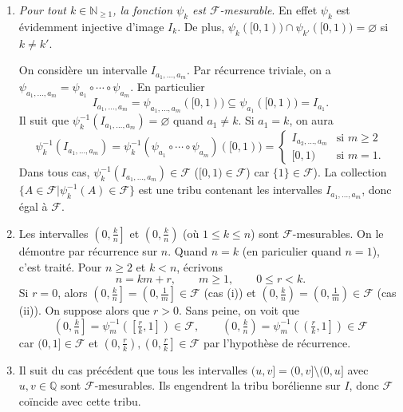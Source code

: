 \documentclass[french]{article}
\theoremstyle{definition}
\newcommand{\tuple}[1]{\left(#1\right)}
\newcommand{\oin}[1]{\left(#1\right)}
\newcommand{\cin}[1]{\left[#1\right]}
\newcommand{\olin}[1]{\left(#1\right]}
\newcommand{\Nbb}{\mathbb{N}}
\newcommand{\Qbb}{\mathbb{Q}}
\newcommand{\Fcal}{\mathcal{F}}
\begin{document}
\begin{enumerate}
\begin{enumerate}
\begin{enumerate}
                \item {\it Pour tout $k \in \Nbb_{\ge 1}$, la fonction $\psi_k$ est $\Fcal$-mesurable}. En effet $\psi_k$ est \'evidemment injective d'image $I_k$. De plus, $\psi_k([0,1)) \cap \psi_{k'}([0,1)) = \varnothing$ si $k \neq k'$. 
                
                On consid\`ere un intervalle $I_{a_1,\ldots,a_m}$. Par r\'ecurrence triviale, on a $\psi_{a_1,\ldots,a_m} = \psi_{a_1} \circ \cdots \circ \psi_{a_m}$. En particulier 
                    $$I_{a_1,\ldots,a_m} = \psi_{a_1,\ldots,a_m}([0,1)) \subseteq \psi_{a_1}([0,1)) = I_{a_1}.$$
                Il suit que $\psi^{-1}_k(I_{a_1,\ldots,a_m}) = \varnothing$ quand $a_1 \neq k$.  Si $a_1 = k$, on aura
                    $$ \psi^{-1}_{k}(I_{a_1,\ldots,a_m}) = \psi^{-1}_k(\psi_{a_1} \circ \cdots \circ \psi_{a_m})([0,1)) = \begin{cases}
                       I_{a_2,\ldots,a_m} & \text{si } m \ge 2\\
                       [0,1) & \text{si } m = 1.
                    \end{cases}$$
                Dans tous cas, $\psi^{-1}_k(I_{a_1,\ldots,a_m}) \in \Fcal$ ($[0,1) \in \Fcal$) car $\{1\} \in \Fcal$). La collection $\{A \in \Fcal | \psi_k^{-1}(A) \in \Fcal\}$ est une tribu contenant les intervalles $I_{a_1,\ldots,a_m}$, donc \'egal \`a $\Fcal$.
                
                \item Les intervalles $\olin{0,\tfrac{k}{n}}$ et $\oin{0,\tfrac{k}{n}}$  (o\`u $1 \le k \le n$) sont $\Fcal$-mesurables. On le d\'emontre par r\'ecurrence sur $n$. Quand $n = k$ (en pariculier quand $n = 1$), c'est trait\'e. Pour $n \ge 2$ et $k < n$, \'ecrivons
                    $$n = km + r, \qquad m \ge 1, \qquad 0 \le r < k.$$
                Si $r = 0$, alors $\olin{0,\tfrac{k}{n}} = \olin{0,\tfrac{1}{m}} \in \Fcal$ (cas (i)) et $\oin{0,\tfrac{k}{n}} = \oin{0,\tfrac{1}{m}} \in \Fcal$  (cas (ii)). On suppose alors que $r > 0$. Sans peine, on voit que
                    $$\olin{0,\tfrac{k}{n}} = \psi^{-1}_m\tuple{\cin{\tfrac{r}{k},1}} \in \Fcal, \qquad \oin{0,\tfrac{k}{n}} = \psi^{-1}_m\tuple{\olin{\tfrac{r}{k},1}} \in \Fcal$$
                car $(0,1] \in \Fcal$ et $\oin{0,\tfrac{r}{k}},\olin{0,\tfrac{r}{k}}\in \Fcal$ par l'hypoth\`ese de r\'ecurrence.
                
                \item Il suit du cas pr\'ec\'edent que tous les intervalles $(u,v] = (0,v] \setminus (0,u]$ avec $u,v \in \Qbb$ sont $\Fcal$-mesurables. Ils engendrent la tribu bor\'elienne sur $I$, donc $\Fcal$ co\"incide avec cette tribu.
            \end{enumerate}
        \end{enumerate}
        

\end{enumerate}
\end{document}
